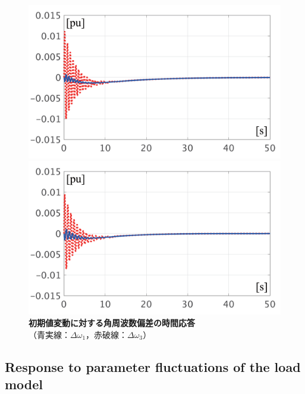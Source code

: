 \documentclass[graybox, envcountchap]{svmult}
\begin{document}
\begin{figure}[t]
  \centering
  {
  \begin{minipage}{0.49\linewidth}
    \centering
    \includegraphics[width = 1.0\linewidth]{figs/P1ini}
  \end{minipage}
  \begin{minipage}{0.49\linewidth}
    \centering
    \includegraphics[width = 1.0\linewidth]{figs/P3ini}
  \end{minipage}
  \medskip
  \caption{\textbf{初期値変動に対する角周波数偏差の時間応答}
  \\ \centering（青実線：$\Delta \omega_1$，赤破線：$\Delta \omega_3$）}
  \label{fig:P13ini}
  }
\medskip
\end{figure}

\subsection{Response to parameter fluctuations of the load model}\label{sec:resldpara}
\end{document}
